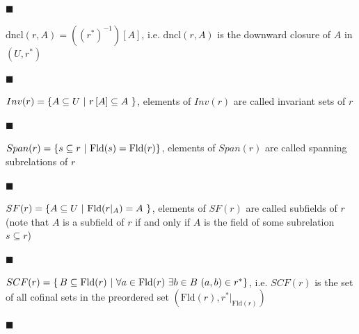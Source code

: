\documentclass[10pt,a4paper]{amsart}
\begin{document}
 
 
\par\noindent  $\blacksquare$ 
 
$\mathrm{dncl}(r,A)=((r^{*})^{-1})[A]$, i.e. $\mathrm{dncl}(r,A)$ is the downward closure of $A$ in $(U,r^{*})$\par
 
 
 
\par\noindent  $\blacksquare$ 
 
$Inv(r)=\{A\subseteq U\leavevmode\nobreak\ |\leavevmode\nobreak\ r\left[A\right%
]\subseteq A\leavevmode\nobreak\ \}$, elements of $Inv(r)$ are called invariant sets of $r$\par
 
 
 
\par\noindent  $\blacksquare$ 
 
$Span(r)=\{s\subseteq r\leavevmode\nobreak\ |\leavevmode\nobreak\ \mathrm{Fld}(%
s)=\mathrm{Fld}(r)\}$, elements of $Span(r)$ are called spanning subrelations of $r$\par
 
 
 
\par\noindent  $\blacksquare$ 
 
$SF(r)=\{A\subseteq U\leavevmode\nobreak\ |\leavevmode\nobreak\ \mathrm{Fld}(r|%
_{A})=A\leavevmode\nobreak\ \}$, elements of $SF(r)$ are called subfields of $r$ (note that $A$ is a subfield of $r$ if and only if $A$ is the field of some subrelation $s\subseteq r$)\par
 
 
 
\par\noindent  $\blacksquare$ 
 
$SCF(r)=\{\,B\subseteq\mathrm{Fld}(r)\leavevmode\nobreak\ |\leavevmode\nobreak%
\ \forall a\in\mathrm{Fld}(r)\leavevmode\nobreak\ \exists b\in B\leavevmode%
\nobreak\ (a,b)\in r^{*}\}$, i.e. $SCF(r)$ is the set of all cofinal sets in the preordered set $(\mathrm{Fld}(r),r^{*}|_{\mathrm{Fld}(r)})$\par
 
 
 
\par\noindent  $\blacksquare$ 
 
\end{document}
